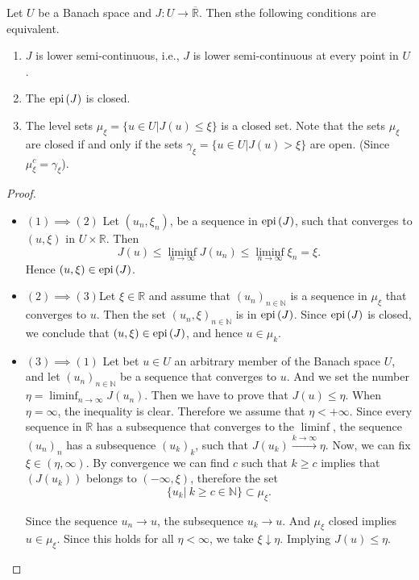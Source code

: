 \begin{theorem}
	\label{th4: levelsets and lsc}
	Let $U$ be a Banach space and $J: U\rightarrow \overline{\mathbb{R}}$. Then sthe following conditions are equivalent.
	\begin{enumerate}
		\item $J$ is lower semi-continuous, i.e., $J$ is lower semi-continuous at every point in $U$.
		\item The $\mathrm{epi\,}(J)$ is closed.
		\item The level sets $\mu_\xi=\lbrace u \in U | J(u)\leq \xi \rbrace$ is a closed set. Note that  the sets $\mu_\xi$ are closed if and only if the sets $\gamma_\xi=\lbrace u \in U | J(u)> \xi \rbrace $ are open. (Since $\mu_\xi ^c = \gamma _\xi$).

	\end{enumerate}
	\begin{proof}\
		
		\begin{itemize}
			\item $(1)\implies(2)$ Let $(u_n, \xi_n)$, be a sequence in $\mathrm{epi\,}(J)$, such that converges to $(u,\xi)$ in $U\times\mathbb{R}$. Then \[J(u)\leq \liminf_{n\rightarrow \infty} J(u_n) \leq \liminf_{n\rightarrow \infty}\xi_n=\xi. \]Hence $(u, \xi) \in \mathrm{epi\,} (J)$.
			
			\item $(2)\implies (3)$Let $\xi\in \mathbb{R}$ and assume that $(u_n)_{n\in \mathbb{N}}$ is a sequence in $\mu_\xi$ that converges to $u$. 
			Then the set $(u_n,\xi)_{n\in\mathbb{N}}$ is in $\mathrm{epi\,} (J)$. Since $\mathrm{epi\,} (J)$ is closed, we conclude that $(u, \xi)\in \mathrm{epi\,} (J)$, and hence $u \in \mu_k$.
			
			\item $(3)\implies (1)$ Let bet $u \in U$ an arbitrary member of the Banach space $U$, and let $(u_n)_{n\in \mathbb{N}}$ be a sequence that converges to $u$. And we set the number $\eta=\liminf_{n\rightarrow \infty} J(u_n)$. Then we have to prove that $J(u)\leq \eta$. When $\eta=\infty$, the inequality is clear. Therefore we assume that $\eta < +\infty$. Since every sequence in $\mathbb{R}$ has a subsequence that converges to the $\liminf$, the sequence $(u_n)_n$ has a subsequence $(u_k)_k$, such that $J(u_k) \xrightarrow{k\rightarrow\infty} \eta$. Now, we can fix $\xi \in (\eta, \infty)$. By convergence we can find $c$ such that $k\geq c$ implies that $(J(u_k))$ belongs to $(-\infty, \xi)$, therefore the set \[\lbrace u_k | \ k \geq c \in \mathbb{N}\rbrace \subset \mu_\xi. \]
			
			Since the sequence $u_n \rightarrow u$, the subsequence $u_k\rightarrow u$. And $\mu_\xi$ closed implies $u \in \mu_\xi$. Since this holds for all $\eta < \infty$, we take $\xi \downarrow \eta$. Implying $J(u)\leq \eta$. 
		\end{itemize}
	\end{proof}
\end{theorem}
